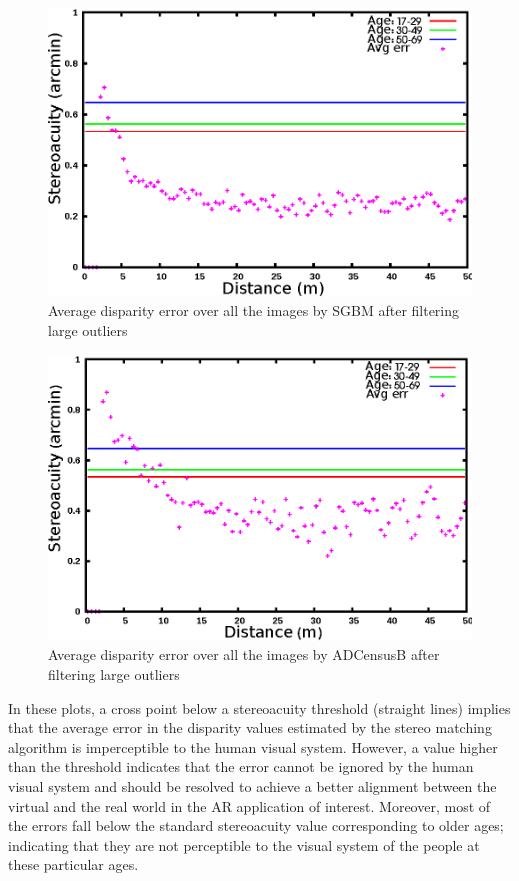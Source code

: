 \begin{figure}[H]
\centering
\includegraphics[scale=0.95]{sgbmmsk3}
\caption{Average disparity error over all the images by SGBM after filtering large outliers}
\label{fig:mskmapsgbm3}
\end{figure} 
\begin{figure}[H]
\centering
\includegraphics[scale=0.95]{adcenmsk3}
\caption{Average disparity error over all the images by ADCensusB after filtering large outliers}
\label{fig:mskmapadc3}
\end{figure} 

In these plots, a cross point below a stereoacuity threshold (straight lines) implies that the average error in the disparity values estimated 
by the stereo matching 
algorithm is imperceptible to the human visual system. However, a value higher than the threshold indicates that
the error cannot be ignored by the human visual system and should be resolved to achieve a better alignment between the virtual and the 
real world in the AR application of interest. Moreover, most of the errors
fall below the standard stereoacuity value corresponding to older ages; indicating that they are not perceptible to the visual system of the people at these 
particular ages.

